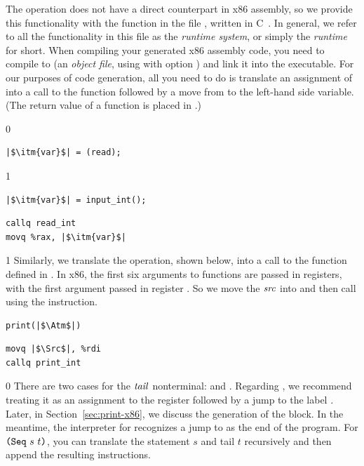 \documentclass[7x10]{TimesAPriori_MIT}%
\def\racketEd{0}
\def\pythonEd{1}
\def\edition{1}
\newcommand{\pythonColor}[0]{}
\numberwithin{theorem}{chapter}
\numberwithin{definition}{chapter}
\numberwithin{equation}{chapter}
\begin{document}
The \READOP{} operation does not have a direct counterpart in x86
assembly, so we provide this functionality with the function
 in the file , written in
C~\citep{Kernighan:1988nx}. In general, we refer to all the
functionality in this file as the \emph{runtime system}, or simply the \emph{runtime} for short. When compiling your
generated x86 assembly code, you need to compile  to
 (an \emph{object file}, using  with option
) and link it into the executable. For our purposes of code
generation, all you need to do is translate an assignment of
\READOP{} into a call to the  function followed by a
move from  to the left-hand side variable.  (The
return value of a function is placed in .)  
\begin{transformation}
{\if\edition\racketEd  
\begin{lstlisting}
|$\itm{var}$| = (read);
\end{lstlisting}
\fi}
{\if\edition\pythonEd\pythonColor
\begin{lstlisting}
|$\itm{var}$| = input_int();
\end{lstlisting}
\fi}
\compilesto
\begin{lstlisting}
callq read_int
movq %rax, |$\itm{var}$|
\end{lstlisting}
\end{transformation}

{\if\edition\pythonEd\pythonColor
%
Similarly, we translate the  operation, shown below, into
a call to the  function defined in .
In x86, the first six arguments to functions are passed in registers,
with the first argument passed in register . So we move the
$\mathit{src}$ into  and then call  using the
 instruction.
\begin{transformation}
\begin{lstlisting}
print(|$\Atm$|)    
\end{lstlisting}
\compilesto
\begin{lstlisting}
movq |$\Src$|, %rdi
callq print_int  
\end{lstlisting}
\end{transformation}
%
\fi}  

{\if\edition\racketEd
%
There are two cases for the $\mathit{tail}$ nonterminal:  and
. Regarding , we recommend treating it as an
assignment to the  register followed by a jump to
the label . Later, in Section~\ref{sec:print-x86},
we discuss the generation of the  block.
In the meantime, the interpreter for \LangXVar{} recognizes a jump
to  as the end of the program.
For $\texttt{(Seq}~s~t\texttt{)}$, you can translate the statement $s$ and tail $t$
recursively and then append the resulting instructions.
%
\fi}
\end{document}
